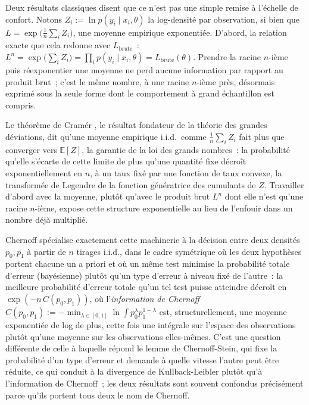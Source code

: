 \documentclass[11pt]{article}
\begin{document}
Deux résultats classiques disent que ce n'est pas une simple remise à
l'échelle de confort. Notons $Z_i := \ln p(y_i \mid x_i, \theta)$ la
log-densité par observation, si bien que $L = \exp\big(\frac1n\sum_i
Z_i\big)$, une moyenne empirique exponentiée. D'abord, la relation
exacte que cela redonne avec $L_{\text{brute}}$~: $L^n =
\exp\big(\sum_i Z_i\big) = \prod_i p(y_i \mid x_i, \theta) =
L_{\text{brute}}(\theta)$. Prendre la racine $n$-ième puis
réexponentier une moyenne ne perd aucune information par rapport au
produit brut~; c'est le même nombre, à une racine $n$-ième près,
désormais exprimé sous la seule forme dont le comportement à grand
échantillon est compris.

Le théorème de Cram\'er \citep{cramer1938}, le résultat fondateur de
la théorie des grandes déviations, dit qu'une moyenne empirique
i.i.d.\ comme $\frac1n\sum_i Z_i$ fait plus que converger vers
$\mathbb E[Z]$, la garantie de la loi des grands nombres~: la
probabilité qu'elle s'écarte de cette limite de plus qu'une quantité
fixe décroît exponentiellement en $n$, à un taux fixé par une fonction
de taux convexe, la transformée de Legendre de la fonction génératrice
des cumulants de $Z$. Travailler d'abord avec la moyenne, plutôt
qu'avec le produit brut $L^n$ dont elle n'est qu'une racine $n$-ième,
expose cette structure exponentielle au lieu de l'enfouir dans un
nombre déjà multiplié.

Chernoff \citep{chernoff1952} spécialise exactement cette machinerie à
la décision entre deux densités $p_0, p_1$ à partir de $n$ tirages
i.i.d., dans le cadre symétrique où les deux hypothèses portent
chacune un a priori et où un même test minimise la probabilité totale
d'erreur (bayésienne) plutôt qu'un type d'erreur à niveau fixé de
l'autre~: la meilleure probabilité d'erreur totale qu'un tel test
puisse atteindre décroît en $\exp(-n\,C(p_0,p_1))$, où
l'\emph{information de Chernoff} $C(p_0,p_1) := -\min_{\lambda \in
[0,1]} \ln \int p_0^\lambda p_1^{1-\lambda}$ est, structurellement,
une moyenne exponentiée de log de plus, cette fois une intégrale sur
l'espace des observations plutôt qu'une moyenne sur les observations
elles-mêmes. C'est une question différente de celle à laquelle répond
le lemme de Chernoff-Stein, qui fixe la probabilité d'un type d'erreur
et demande à quelle vitesse l'autre peut être réduite, ce qui conduit
à la divergence de Kullback-Leibler plutôt qu'à l'information de
Chernoff~; les deux résultats sont souvent confondus précisément parce
qu'ils portent tous deux le nom de Chernoff.
\end{document}
